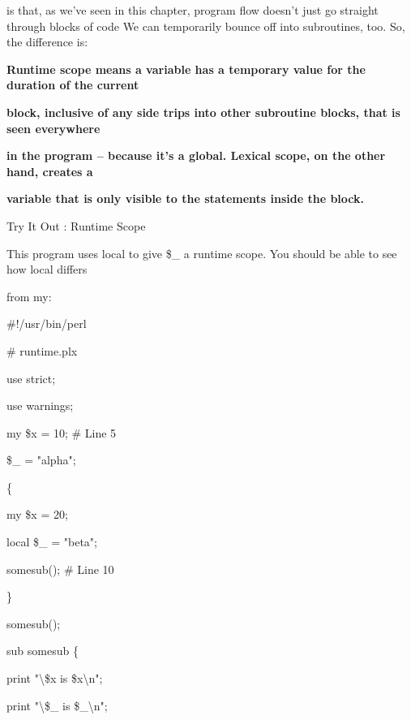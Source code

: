 \documentclass[a4paper,11pt]{book}
\begin{document}
\noindent is that, as we've seen in this chapter, program flow doesn't just go straight through blocks of code We can temporarily bounce off into subroutines, too. So, the difference is:

\noindent 

\noindent 

\noindent \textbf{Runtime scope means a variable has a temporary value for the duration of the current}

\noindent \textbf{block, inclusive of any side trips into other subroutine blocks, that is seen everywhere}

\noindent \textbf{in the program -- because it's a global. Lexical scope, on the other hand, creates a}

\noindent \textbf{variable that is only visible to the statements inside the block.}

\noindent 

\noindent 

\noindent Try It Out : Runtime Scope

\noindent 

\noindent 

\noindent This program uses local to give \$\_ a runtime scope. You should be able to see how local differs

\noindent from my:

\noindent 

\noindent 

\noindent \#!/usr/bin/perl

\noindent \# runtime.plx

\noindent use strict;

\noindent use warnings;

\noindent my \$x = 10; \# Line 5

\noindent \$\_  = "alpha";

\noindent \{

\noindent my \$x = 20;

\noindent local \$\_  = "beta";

\noindent somesub(); \# Line 10

\noindent \}

\noindent somesub();

\noindent 

\noindent sub somesub \{

\noindent print "\textbackslash \$x is \$x\textbackslash n";

\noindent print "\textbackslash \$\_  is \$\_\textbackslash n";
\end{document}
